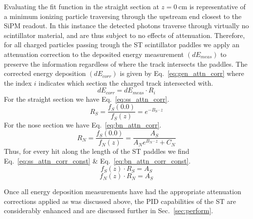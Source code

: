 Evaluating the fit function in the straight section at $z = 0\ \mathrm{cm}$ is representative of a minimum ionizing particle traversing through the upstream end closest to the SiPM readout.  In this instance the detected photons traverse through virtually no scintillator material, and are thus subject to no effects of attenuation.  Therefore, for all charged particles passing trough the ST scintillator paddles we apply an attenuation correction to the deposited energy measurement $(dE_{meas})$ to preserve the information regardless of where the track intersects the paddles.  The corrected energy deposition $(dE_{corr})$ is given by Eq.~\ref{eq:gen_attn_corr} where the index $i$ indicates which section the charged track intersected with.
	\begin{equation} \label{eq:gen_attn_corr}
		dE_{corr} = dE_{meas} \cdot R_{i}
	\end{equation}
For the straight section we have Eq.~\ref{eq:ss_attn_corr}.
	\begin{equation} \label{eq:ss_attn_corr}
		R_{S} = \frac{f_{S}(0.0)}{f_{S}(z)} = e^{-B_{S} \cdot z}
	\end{equation}
For the nose section we have Eq.~\ref{eq:bn_attn_corr}.
	\begin{equation} \label{eq:bn_attn_corr}
		R_{N} = \frac{f_{S}(0.0)}{f_{N}(z)} = \frac{A_{S}}{A_{N}e^{B_{N} \cdot z} + C_{N}}
	\end{equation}
Thus, for every hit along the length of the ST paddles we find Eq.~\ref{eq:ss_attn_corr_const} \& Eq.~\ref{eq:bn_attn_corr_const}.
	\begin{equation} \label{eq:ss_attn_corr_const}
		f_{S}(z) \cdot R_{S} = A_{S}
	\end{equation}
	\begin{equation} \label{eq:bn_attn_corr_const}
		f_{N}(z) \cdot R_{N} = A_{S}
	\end{equation}

Once all energy deposition measurements have had the appropriate attenuation corrections applied as was discussed above, the PID capabilities of the ST are considerably enhanced and are discussed further in Sec.~\ref{sec:perform}.


